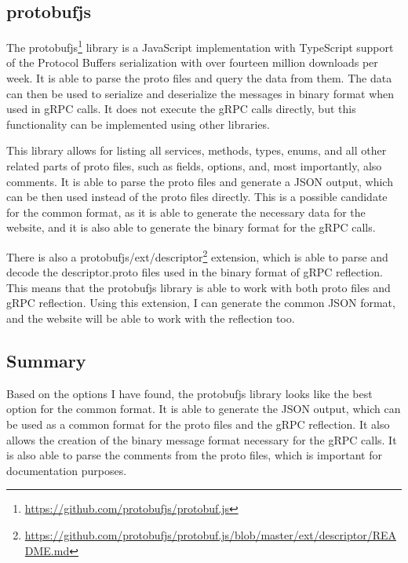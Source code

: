 
\subsection{protobufjs}
The protobufjs\footnote{\url{https://github.com/protobufjs/protobuf.js}} library is a JavaScript implementation with TypeScript support of the Protocol Buffers serialization with over fourteen million downloads per week.
It is able to parse the proto files and query the data from them.
The data can then be used to serialize and deserialize the messages in binary format when used in gRPC calls.
It does not execute the gRPC calls directly, but this functionality can be implemented using other libraries.
\cite{protobufjs}

This library allows for listing all services, methods, types, enums, and all other related parts of proto files, such as fields, options, and, most importantly, also comments.
It is able to parse the proto files and generate a JSON output, which can be then used instead of the proto files directly.
This is a possible candidate for the common format, as it is able to generate the necessary data for the website, and it is also able to generate the binary format for the gRPC calls.

There is also a protobufjs/ext/descriptor\footnote{\url{https://github.com/protobufjs/protobuf.js/blob/master/ext/descriptor/README.md}} extension, which is able to parse and decode the descriptor.proto files used in the binary format of gRPC reflection.
This means that the protobufjs library is able to work with both proto files and gRPC reflection.
Using this extension, I can generate the common JSON format, and the website will be able to work with the reflection too.

\subsection{Summary}

Based on the options I have found, the protobufjs library looks like the best option for the common format.
It is able to generate the JSON output, which can be used as a common format for the proto files and the gRPC reflection.
It also allows the creation of the binary message format necessary for the gRPC calls.
It is also able to parse the comments from the proto files, which is important for documentation purposes.

